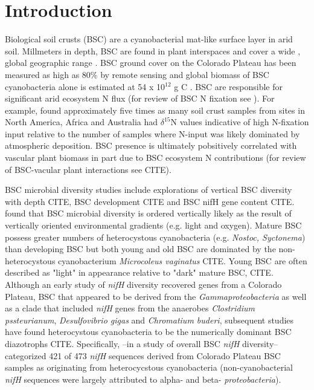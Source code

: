 \section{Introduction}


Biological soil crusts (BSC) are a cyanobacterial mat-like surface layer in arid soil. Millmeters in depth, BSC are found in plant interspaces and cover a wide , global geographic range \cite{garcia2003estimates}. BSC ground cover on the Colorado Plateau has been measured as high as 80\% by remote sensing \cite{karnieli2001} and global biomass of BSC cyanobacteria alone is estimated at 54 x 10$^{12}$ g C \cite{garcia2003estimates}. BSC are responsible for significant arid ecosystem N flux (for review of BSC N fixation see \citet{belnap2003}). For example, \citet{Evans_1999} found approximately five times as many soil crust samples from sites in North America, Africa and Australia had $\delta^{15}$N values indicative of high N-fixation input relative to the number of samples where N-input was likely dominated by atmospheric deposition. BSC presence is ultimately pobsitively correlated with vascular plant biomass in part due to BSC ecosystem N contributions (for review of BSC-vacular plant interactions see CITE).

BSC microbial diversity studies include explorations of vertical BSC diversity with depth CITE, BSC development CITE and BSC nifH gene content CITE. \citet{Garcia_Pichel_2003} found that BSC microbial diversity is ordered vertically likely as the result of vertically oriented environmental gradients (e.g. light and oxygen). Mature BSC possess greater numbers of heterocystous cyanobacteria (e.g. \textit{Nostoc, Syctonema}) than developing BSC but both young and old BSC are dominated by the non-heterocystous cyanobacterium \textit{Microcoleus vaginatus} CITE. Young BSC are often described as "light" in appearance relative to "dark" mature BSC, CITE.  Although an early study of \textit{nifH} diversity recovered genes from a Colorado Plateau, BSC that appeared to be derived from the \textit{Gammaproteobacteria} as well as a clade that included \textit{nifH} genes from the anaerobes \textit{Clostridium pssteurianum}, \textit{Desulfovibrio gigas} and \textit{Chromatium buderi}, subsequent studies have found heterocystous cyanobacteria to be the numerically dominant BSC diazotrophs CITE. Specifically, \citet{Yeager}--in a study of overall BSC \textit{nifH} diversity--categorized 421 of 473 \textit{nifH} sequences derived from Colorado Plateau BSC samples as originating from heterocycstous cyanobacteria (non-cyanobacterial \textit{nifH} sequences were largely attributed to alpha- and beta- \textit{proteobacteria}).

